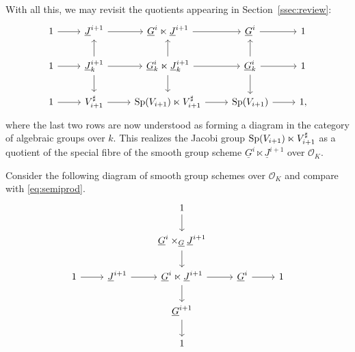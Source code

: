 \documentclass[10pt]{amsart}
\theoremstyle{plain}
\theoremstyle{definition}
\newcommand{\OK}{\mathcal{O}_K}
\newcommand{\Fq}{k}
\begin{document}
With all this, we may revisit the quotients appearing in Section~\ref{ssec:review}:
\[
\begin{tikzcd}
1 \arrow{r} & \underline{J}^{i+1}  \arrow{r} & \underline{G}^i \ltimes \underline{J}^{i+1} \arrow{r} & \underline{G}^i \arrow{r}  & 1\\
1 \arrow{r} & \underline{J}^{i+1}_\Fq \arrow{d} \arrow{u} \arrow{r} & \underline{G}_\Fq^i \ltimes \underline{J}_\Fq^{i+1} \arrow{d} \arrow{u} \arrow{r} & \underline{G}_\Fq^i \arrow{r} \arrow{d} \arrow{u} & 1\\ 
1 \arrow{r} & V_{i+1}^\sharp \arrow{r} & \Sp(V_{i+1}) \ltimes V_{i+1}^\sharp \arrow{r} & \Sp(V_{i+1}) \arrow{r} & 1,
\end{tikzcd}
\]
where the last two rows are now understood as forming a diagram in the category of algebraic groups over $\Fq$. 
This realizes the Jacobi group ${\operatorname{Sp}}(V_{i+1}) \ltimes V_{i+1}^\sharp$ as a quotient of the special fibre of the smooth group scheme $\underline{G}^i \ltimes \underline{J}^{i+1}$ over $\OK$. 

Consider the following diagram of smooth group schemes over $\OK$ and compare with \eqref{eq:semiprod}.
\begin{equation}\label{eq:pimodel}
\begin{tikzcd}
\ && 1 \arrow{d} && \\
\ && \underline{G}^{i}\times_{\underline{G}} \underline{J}^{i+1}\arrow{d} && \\
1 \arrow{r} & \underline{J}^{i+1} \arrow{r} & \underline{G}^i \ltimes \underline{J}^{i+1} \arrow{d} \arrow{r} & \underline{G}^i \arrow{r} & 1\\
&& \underline{G}^{i+1} \arrow{d} && \\
&& 1 &&
\end{tikzcd}
\end{equation}
\end{document}
